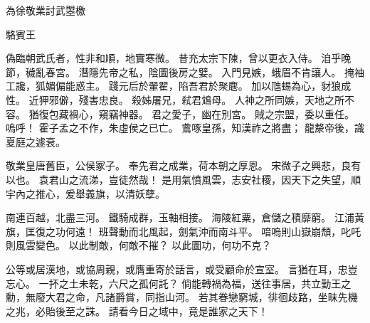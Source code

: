 為徐敬業討武曌檄

駱賓王

偽臨朝武氏者，性非和順，地實寒微。
昔充太宗下陳，曾以更衣入侍。
洎乎晚節，穢亂春宮。
潛隱先帝之私，陰圖後房之嬖。
入門見嫉，蛾眉不肯讓人。
掩袖工讒，狐媚偏能惑主。
踐元后於翬翟，陷吾君於聚麀。
加以虺蜴為心，豺狼成性。
近狎邪僻，殘害忠良。
殺姊屠兄，弒君鴆母。
人神之所同嫉，天地之所不容。
猶復包藏禍心，窺竊神器。
君之愛子，幽在別宮。
賊之宗盟，委以重任。
嗚呼！
霍子孟之不作，朱虛侯之已亡。
鷰啄皇孫，知漢祚之將盡；
龍漦帝後，識夏庭之遽衰。

敬業皇唐舊臣，公侯冢子。
奉先君之成業，荷本朝之厚恩。
宋微子之興悲，良有以也。
袁君山之流涕，豈徒然哉！
是用氣憤風雲，志安社稷，因天下之失望，順宇內之推心，爰舉義旗，以清妖孽。

南連百越，北盡三河。
鐵騎成群，玉軸相接。
海陵紅粟，倉儲之積靡窮。
江浦黃旗，匡復之功何遠！
班聲動而北風起，劍氣沖而南斗平。
喑嗚則山嶽崩頹，叱吒則風雲變色。
以此制敵，何敵不摧？
以此圖功，何功不克？

公等或居漢地，或協周親，或膺重寄於話言，或受顧命於宣室。
言猶在耳，忠豈忘心。
一抔之土未乾，六尺之孤何託？
倘能轉禍為福，送往事居，共立勤王之勳，無廢大君之命，凡諸爵賞，同指山河。
若其眷戀窮城，徘徊歧路，坐昧先機之兆，必貽後至之誅。
請看今日之域中，竟是誰家之天下！